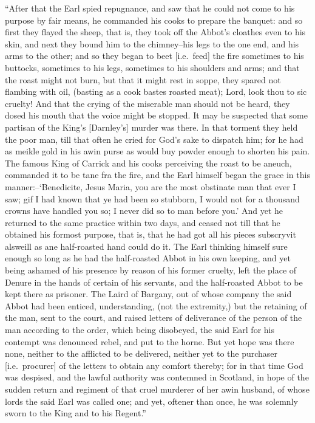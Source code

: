 ``After that the Earl spied repugnance, and saw that he could not come
to his purpose by fair means, he commanded his cooks to prepare the
banquet: and so first they flayed the sheep, that is, they took off the
Abbot's cloathes even to his skin, and next they bound him to the
chimney--his legs to the one end, and his arms to the other; and so they
began to beet {[}i.e.~feed{]} the fire sometimes to his buttocks,
sometimes to his legs, sometimes to his shoulders and arms; and that the
roast might not burn, but that it might rest in soppe, they spared not
flambing with oil, (basting as a cook bastes roasted meat); Lord, look
thou to sic cruelty! And that the crying of the miserable man should not
be heard, they dosed his mouth that the voice might be stopped. It may
be suspected that some partisan of the King's {[}Darnley's{]} murder was
there. In that torment they held the poor man, till that often he cried
for God's sake to dispatch him; for he had as meikle gold in his awin
purse as would buy powder enough to shorten his pain. The famous King of
Carrick and his cooks perceiving the roast to be aneuch, commanded it to
be tane fra the fire, and the Earl himself began the grace in this
manner:--`Benedicite, Jesus Maria, you are the most obstinate man that
ever I saw; gif I had known that ye had been so stubborn, I would not
for a thousand crowns have handled you so; I never did so to man before
you.' And yet he returned to the same practice within two days, and
ceased not till that he obtained his formost purpose, that is, that he
had got all his pieces subscryvit alsweill as ane half-roasted hand
could do it. The Earl thinking himself sure enough so long as he had the
half-roasted Abbot in his own keeping, and yet being ashamed of his
presence by reason of his former cruelty, left the place of Denure in
the hands of certain of his servants, and the half-roasted Abbot to be
kept there as prisoner. The Laird of Bargany, out of whose company the
said Abbot had been enticed, understanding, (not the extremity,) but the
retaining of the man, sent to the court, and raised letters of
deliverance of the person of the man according to the order, which being
disobeyed, the said Earl for his contempt was denounced rebel, and put
to the horne. But yet hope was there none, neither to the afflicted to
be delivered, neither yet to the purchaser {[}i.e.~procurer{]} of the
letters to obtain any comfort thereby; for in that time God was
despised, and the lawful authority was contemned in Scotland, in hope of
the sudden return and regiment of that cruel murderer of her awin
husband, of whose lords the said Earl was called one; and yet, oftener
than once, he was solemnly sworn to the King and to his Regent.''

